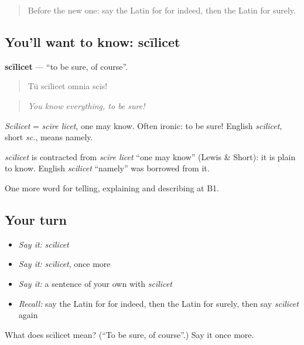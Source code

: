 \label{lesson:LA-C365-scilicet}



\begin{quote}
Before the new one: say the Latin for for indeed, then the Latin for surely.
\end{quote}

\subsection*{You'll want to know: scīlicet}
\textbf{scīlicet} — \textquotedblleft{}to be sure, of course\textquotedblright{}.

\begin{quote}
Tū scīlicet omnia scīs!
\end{quote}

\begin{quote}
\emph{You know everything, to be sure!}
\end{quote}

\emph{Scīlicet} = \emph{scīre licet}, one may know. Often ironic: to be sure! English \emph{scilicet}, short \emph{sc.}, means namely.

\begin{cousinweb}
\emph{scīlicet} is contracted from \emph{scīre licet} \textquotedblleft{}one may know\textquotedblright{} (Lewis \& Short): it is plain to know. English \emph{scilicet} \textquotedblleft{}namely\textquotedblright{} was borrowed from it.
\end{cousinweb}

\begin{grammarlens}[title={What you've built}]
One more word for telling, explaining and describing at B1.
\end{grammarlens}

\subsection*{Your turn}
\begin{itemize}
\raggedright
  \item \emph{Say it:} \emph{scīlicet}
  \item \emph{Say it:} \emph{scīlicet}, once more
  \item \emph{Say it:} a sentence of your own with \emph{scīlicet}
  \item \emph{Recall:} say the Latin for for indeed, then the Latin for surely, then say \emph{scīlicet} again
\end{itemize}

\begin{tcolorbox}[breakable,colback=teal!4,colframe=teal!35!black,title={Before you move on}]
What does scīlicet mean? (\textquotedblleft{}To be sure, of course\textquotedblright{}.) Say it once more.
\end{tcolorbox}
